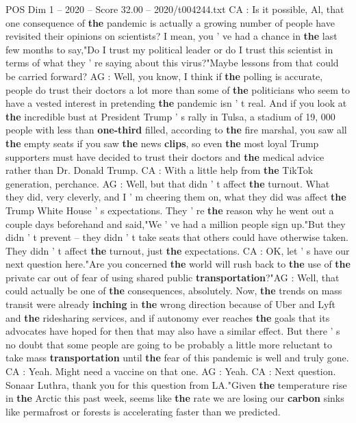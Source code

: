 \begin{textsample}{POS Dim 1 – 2020 – Score 32.00 – 2020/t004244.txt}
CA : Is it possible, Al, that one consequence of \textbf{the} pandemic is actually a growing number of people have revisited their opinions on scientists?
I mean, you ' ve had a chance in \textbf{the} last few months to say,"Do I trust my political leader or do I trust this scientist in terms of what they ' re saying about this virus?"Maybe lessons from that could be carried forward?
AG : Well, you know, I think if \textbf{the} polling is accurate, people do trust their doctors a lot more than some of \textbf{the} politicians who seem to have a vested interest in pretending \textbf{the} pandemic isn ' t real.
And if you look at \textbf{the} incredible bust at President Trump ' s rally in Tulsa, a stadium of 19, 000 people with less than \textbf{one-third} filled, according to \textbf{the} fire marshal, you saw all \textbf{the} empty seats if you saw \textbf{the} news \textbf{clips}, so even \textbf{the} most loyal Trump supporters must have decided to trust their doctors and \textbf{the} medical advice rather than Dr.
Donald Trump.
CA : With a little help from \textbf{the} TikTok generation, perchance.
AG : Well, but that didn ' t affect \textbf{the} turnout.
What they did, very cleverly, and I ' m cheering them on, what they did was affect \textbf{the} Trump White House ' s expectations.
They ' re \textbf{the} reason why he went out a couple days beforehand and said,"We ' ve had a million people sign up."But they didn ' t prevent -- they didn ' t take seats that others could have otherwise taken.
They didn ' t affect \textbf{the} turnout, just \textbf{the} expectations.
CA : OK, let ' s have our next question here."Are you concerned \textbf{the} world will rush back to \textbf{the} use of \textbf{the} private car out of fear of using shared public \textbf{transportation}?"AG : Well, that could actually be one of \textbf{the} consequences, absolutely.
Now, \textbf{the} trends on mass transit were already \textbf{inching} in \textbf{the} wrong direction because of Uber and Lyft and \textbf{the} ridesharing services, and if autonomy ever reaches \textbf{the} goals that its advocates have hoped for then that may also have a similar effect.
But there ' s no doubt that some people are going to be probably a little more reluctant to take mass \textbf{transportation} until \textbf{the} fear of this pandemic is well and truly gone.
CA : Yeah.
Might need a vaccine on that one.
AG : Yeah.
CA : Next question.
Sonaar Luthra, thank you for this question from LA."Given \textbf{the} temperature rise in \textbf{the} Arctic this past week, seems like \textbf{the} rate we are losing our \textbf{carbon} sinks like permafrost or forests is accelerating faster than we predicted.

\end{textsample}
